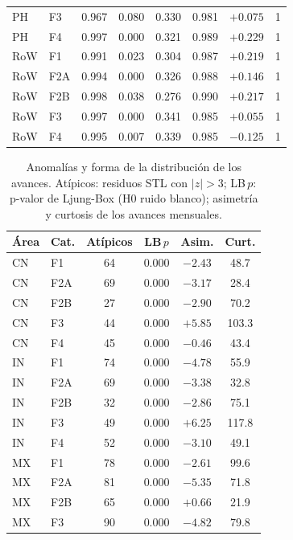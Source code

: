 \documentclass[12pt,letterpaper]{report}
\begin{document}
\begin{table}[H]
\begin{tabular}{llcccccc}
PH & F3 & 0.967 & 0.080 & 0.330 & 0.981 & $+0.075$ & 1 \\
PH & F4 & 0.997 & 0.000 & 0.321 & 0.989 & $+0.229$ & 1 \\
RoW & F1 & 0.991 & 0.023 & 0.304 & 0.987 & $+0.219$ & 1 \\
RoW & F2A & 0.994 & 0.000 & 0.326 & 0.988 & $+0.146$ & 1 \\
RoW & F2B & 0.998 & 0.038 & 0.276 & 0.990 & $+0.217$ & 1 \\
RoW & F3 & 0.997 & 0.000 & 0.341 & 0.985 & $+0.055$ & 1 \\
RoW & F4 & 0.995 & 0.007 & 0.339 & 0.985 & $-0.125$ & 1 \\
\bottomrule
\end{tabular}
\end{table}

\begin{table}[H]
\centering
\footnotesize
\caption[Anomalías y forma de las series]{Anomalías y forma de la distribución de los avances. Atípicos: residuos STL con $|z|>3$; LB$\,p$: p-valor de Ljung-Box (H0 ruido blanco); asimetría y curtosis de los avances mensuales.}
\label{tab:features_anomalias}
\begin{tabular}{llcccc}
\toprule
\rowcolor{uacjblue!15}
\textbf{Área} & \textbf{Cat.} & \textbf{Atípicos} & \textbf{LB}\,$p$ & \textbf{Asim.} & \textbf{Curt.} \\ \midrule
CN & F1 & 64 & 0.000 & $-2.43$ & 48.7 \\
CN & F2A & 69 & 0.000 & $-3.17$ & 28.4 \\
CN & F2B & 27 & 0.000 & $-2.90$ & 70.2 \\
CN & F3 & 44 & 0.000 & $+5.85$ & 103.3 \\
CN & F4 & 45 & 0.000 & $-0.46$ & 43.4 \\
IN & F1 & 74 & 0.000 & $-4.78$ & 55.9 \\
IN & F2A & 69 & 0.000 & $-3.38$ & 32.8 \\
IN & F2B & 32 & 0.000 & $-2.86$ & 75.1 \\
IN & F3 & 49 & 0.000 & $+6.25$ & 117.8 \\
IN & F4 & 52 & 0.000 & $-3.10$ & 49.1 \\
MX & F1 & 78 & 0.000 & $-2.61$ & 99.6 \\
MX & F2A & 81 & 0.000 & $-5.35$ & 71.8 \\
MX & F2B & 65 & 0.000 & $+0.66$ & 21.9 \\
MX & F3 & 90 & 0.000 & $-4.82$ & 79.8 \\

\end{tabular}
\end{table}
\end{document}
